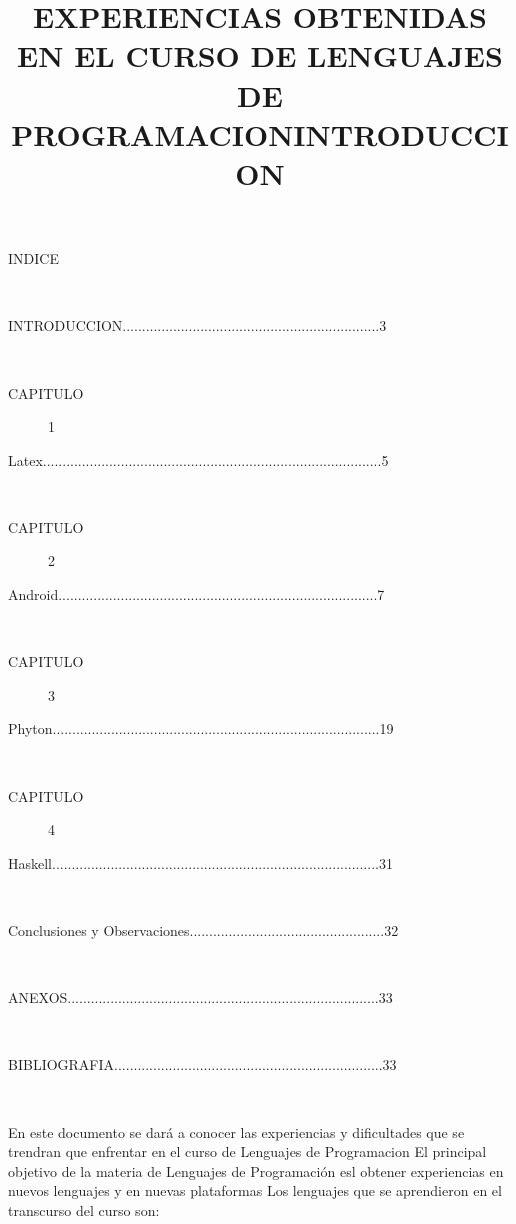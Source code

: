 \documentclass[12pt]{extbook}
\begin{document}
\title{EXPERIENCIAS OBTENIDAS EN EL CURSO DE LENGUAJES DE PROGRAMACION}\maketitle
\begin{center}
\begin{description}
\item [{INDICE}]~
\item [{INTRODUCCION..................................................................3}]~
\item [{CAPITULO}] 1
\item [{Latex.......................................................................................5}]~
\item [{CAPITULO}] 2
\item [{Android..................................................................................7}]~
\item [{CAPITULO}] 3
\item [{Phyton....................................................................................19}]~
\item [{CAPITULO}] 4
\item [{Haskell....................................................................................31}]~
\item [{Conclusiones y Observaciones..................................................32}]~
\item [{ANEXOS................................................................................33}]~
\item [{BIBLIOGRAFIA.....................................................................33}]~
\end{description}


\newpage

\title{INTRODUCCION}\maketitle
\end{center}

En este documento se dará a conocer las experiencias y dificultades que se trendran que enfrentar en el curso de Lenguajes de Programacion
El principal objetivo de la materia de Lenguajes de Programación esl obtener experiencias en nuevos lenguajes y en nuevas plataformas
Los lenguajes que se aprendieron en el transcurso del curso son:\\
\end{document}
